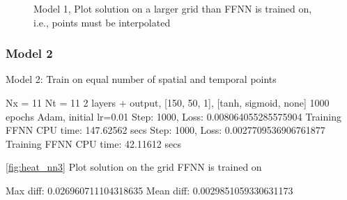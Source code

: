 \begin{figure}[H]
\caption{Model 1, Plot solution on a larger grid than FFNN is trained on, i.e., points must be interpolated}
\label{fig:heat_nn2}
\end{figure}

\subsubsection{Model 2}
Model 2: Train on equal number of spatial and temporal points

Nx = 11
Nt = 11
2 layers + output, [150, 50, 1], [tanh, sigmoid, none] 
1000 epochs
Adam, initial lr=0.01
Step: 1000, Loss: 0.008064055285575904
Training FFNN CPU time: 147.62562 secs
Step: 1000, Loss: 0.0027709536906761877
Training FFNN CPU time: 42.11612 secs

\autoref{fig:heat_nn3} Plot solution on the grid FFNN is trained on

Max diff: 0.026960711104318635
Mean diff: 0.0029851059330631173


